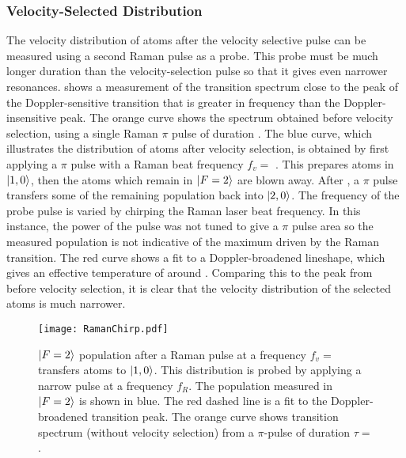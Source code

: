 \subsubsection{Velocity-Selected Distribution}
The velocity distribution of atoms after the velocity selective pulse
can be measured using a second Raman pulse as a probe. This probe must
be much longer duration than
the velocity-selection pulse so that it gives even narrower
resonances. 
 shows a measurement of the transition
spectrum close to the peak of the Doppler-sensitive transition that is
greater in frequency than the Doppler-insensitive peak. The orange
curve shows the spectrum obtained before velocity selection, using a
single Raman $\pi$ pulse of
duration . The blue curve, which illustrates the
distribution of atoms after velocity selection, is obtained by first
applying a
 \(\pi\) pulse with a Raman beat frequency
\(f_v = \) . This prepares atoms in
\(\ket{1,0}\), then the atoms which remain in
\(\ket{F=2}\) are blown away. After , a
 \(\pi\) pulse transfers some of the
remaining population back into \(\ket{2,0}\). The frequency of the
probe pulse is varied by chirping the Raman laser beat frequency. In
this instance, the power of the  pulse was not tuned to give a \(\pi\)
pulse area so the measured population is not indicative of the maximum
driven by the Raman transition. The red curve shows a fit to a
Doppler-broadened lineshape, which gives an effective temperature
of around . Comparing this to the peak from
before velocity selection, it is clear that the velocity
distribution of the selected atoms is much narrower. 
\begin{figure}[htpb!]
  \centering
  \texttt{[image: RamanChirp.pdf]}
  \caption[$\ket{F=2}$ population after a velocity-selective Raman
  $\pi$ pulse.]{\(\ket{F=2}\) population after a Raman pulse at a frequency
    \(f_v =\) transfers atoms to
    \(\ket{1,0}\). This distribution is probed by
  applying a narrow pulse at a frequency \(f_{R}\). The population
measured in \(\ket{F=2}\) is shown in blue. The red dashed line is a
fit to the Doppler-broadened
transition peak. The orange curve shows
transition spectrum (without velocity selection) from a $\pi$-pulse
of duration \(\tau = \).}
  \label{fig:vel_select_chirp}
\end{figure}
